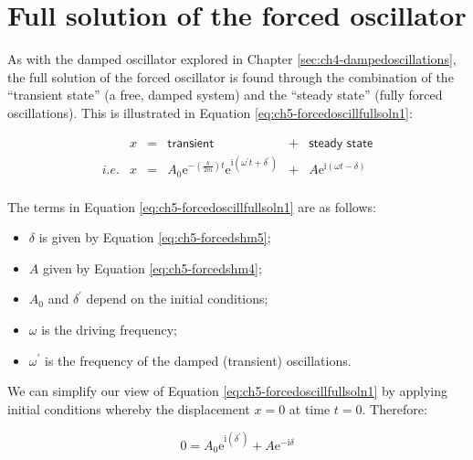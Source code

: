 \documentclass[
]{book}
\providecommand{\tightlist}{%
  \setlength{\itemsep}{0pt}\setlength{\parskip}{0pt}}
\begin{document}
\hypertarget{sec:ch5-fullsolutionforcedoscillator}{%
\section{Full solution of the forced oscillator}\label{sec:ch5-fullsolutionforcedoscillator}}

As with the damped oscillator explored in Chapter \ref{sec:ch4-dampedoscillations}, the full solution of the forced oscillator is found through the combination of the ``transient state'' (a free, damped system) and the ``steady state'' (fully forced oscillations). This is illustrated in Equation \eqref{eq:ch5-forcedoscillfullsoln1}:

\begin{equation}
\begin{array}{lrcccc}
& x &=& \textsf{transient} &+&\textsf{steady state} \\
\textit{i.e.} & x&=& A_0 \mathrm{e}^{- \left(\frac{b}{2m}\right)t} \mathrm{e}^{\mathrm{i} \left( \omega^\prime t + \delta^\prime \right)} &+&  A \mathrm{e}^{\mathrm{i}\left(\omega t - \delta \right)} \\
\end{array}
\label{eq:ch5-forcedoscillfullsoln1}
\end{equation}

The terms in Equation \eqref{eq:ch5-forcedoscillfullsoln1} are as follows:

\begin{itemize}
\tightlist
\item
  \(\delta\) is given by Equation \eqref{eq:ch5-forcedshm5};
\item
  \(A\) given by Equation \eqref{eq:ch5-forcedshm4};
\item
  \(A_0\) and \(\delta^\prime\) depend on the initial conditions;
\item
  \(\omega\) is the driving frequency;
\item
  \(\omega^\prime\) is the frequency of the damped (transient) oscillations.
\end{itemize}

We can simplify our view of Equation \eqref{eq:ch5-forcedoscillfullsoln1} by applying initial conditions whereby the displacement \(x = 0\) at time \(t = 0\). Therefore:

\begin{equation}
0 = A_0 \mathrm{e}^{\mathrm{i} \left( \delta^\prime \right)} + A \mathrm{e}^{-\mathrm{i}\delta}
\end{equation}
\end{document}
